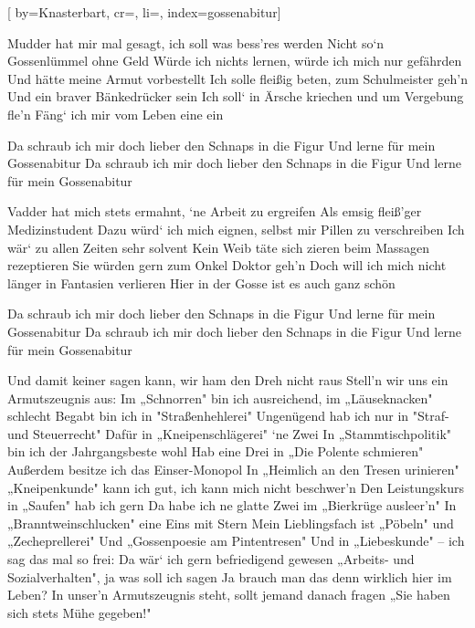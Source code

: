 
[%
    by={Knasterbart},
    cr={},
    li={},
    index={gossenabitur}]


    \label{gossenabitur}

    \beginverse\memorize[verse]
        Mudder hat mir mal gesagt, ich soll was bess'res werden
        Nicht so‘n Gossenlümmel ohne Geld
        Würde ich nichts lernen, würde ich mich nur gefährden
        Und hätte meine Armut vorbestellt
        Ich solle fleißig beten, zum Schulmeister geh'n
        Und ein braver Bänkedrücker sein
        Ich soll‘ in Ärsche kriechen und um Vergebung fle'n
        Fäng‘ ich mir vom Leben eine ein
    \endverse

    \beginchorus\memorize[chorus]
        Da schraub ich mir doch lieber den Schnaps in die Figur
        Und lerne für mein Gossenabitur
        Da schraub ich mir doch lieber den Schnaps in die Figur
        Und lerne für mein Gossenabitur
    \endchorus

    \beginverse\replay[verse]
        Vadder hat mich stets ermahnt, ‘ne Arbeit zu ergreifen
        Als emsig fleiß'ger Medizinstudent
        Dazu würd‘ ich mich eignen, selbst mir Pillen zu verschreiben
        Ich wär‘ zu allen Zeiten sehr solvent
        Kein Weib täte sich zieren beim Massagen rezeptieren
        Sie würden gern zum Onkel Doktor geh'n
        Doch will ich mich nicht länger in Fantasien verlieren
        Hier in der Gosse ist es auch ganz schön
    \endverse

    \beginchorus\replay[chorus]
        Da schraub ich mir doch lieber den Schnaps in die Figur
        Und lerne für mein Gossenabitur
        Da schraub ich mir doch lieber den Schnaps in die Figur
        Und lerne für mein Gossenabitur
    \endchorus

    \beginverse\replay[verse]
        Und damit keiner sagen kann, wir ham den Dreh nicht raus
        Stell'n wir uns ein Armutszeugnis aus:
        Im „Schnorren" bin ich ausreichend, im „Läuseknacken" schlecht
        Begabt bin ich in "Straßenhehlerei"
        Ungenügend hab ich nur in "Straf- und Steuerrecht"
        Dafür in „Kneipenschlägerei" ‘ne Zwei
        In „Stammtischpolitik" bin ich der Jahrgangsbeste wohl
        Hab eine Drei in „Die Polente schmieren"
        Außerdem besitze ich das Einser-Monopol
        In „Heimlich an den Tresen urinieren"
        „Kneipenkunde" kann ich gut, ich kann mich nicht beschwer'n
        Den Leistungskurs in „Saufen" hab ich gern
        Da habe ich ne glatte Zwei im „Bierkrüge ausleer'n"
        In „Branntweinschlucken" eine Eins mit Stern
        Mein Lieblingsfach ist „Pöbeln" und „Zecheprellerei"
        Und „Gossenpoesie am Pintentresen"
        Und in „Liebeskunde" – ich sag das mal so frei:
        Da wär‘ ich gern befriedigend gewesen
        „Arbeits- und Sozialverhalten", ja was soll ich sagen
        Ja brauch man das denn wirklich hier im Leben?
        In unser'n Armutszeugnis steht, sollt jemand danach fragen
        „Sie haben sich stets Mühe gegeben!"
    \endverse

